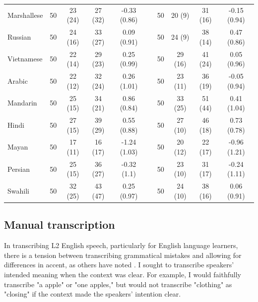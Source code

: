 \documentclass [PhD] {uclathes}
\begin{document}
\begin{table}[htbp]
\begin{tabular}{lccccccccc}
\hspace{3mm} Marshallese & 50 & 23 (24) & 27 (32) & -0.33 (0.86) & & 50 & 20 (9) & 31 (16) & -0.15 (0.94) \\
\hspace{3mm} Russian & 50 & 24 (16) & 33 (27) & 0.09 (0.91) & & 50 & 24 (9) & 38 (14) & 0.47 (0.86) \\
\hspace{3mm} Vietnamese & 50 & 22 (14) & 29 (23) & 0.25 (0.99) & & 50 & 29 (16) & 41 (24) & 0.05 (0.96) \\
\hspace{3mm} Arabic & 50 & 22 (12) & 32 (24) & 0.26 (1.01) & & 50 & 23 (11) & 36 (19) & -0.05 (0.94) \\
\hspace{3mm} Mandarin & 50 & 25 (15) & 34 (21) & 0.86 (0.84) & & 50 & 33 (25) & 51 (44) & 0.41 (1.04) \\
\hspace{3mm} Hindi & 50 & 27 (15) & 39 (29) & 0.55 (0.88) & & 50 & 27 (10) & 46 (18) & 0.73 (0.78) \\
\hspace{3mm} Mayan & 50 & 17 (11) & 16 (17) & -1.24 (1.03) & & 50 & 20 (12) & 22 (17) & -0.96 (1.21) \\
\hspace{3mm} Persian & 50 & 25 (15) & 36 (27) & -0.32 (1.1) & & 50 & 23 (10) & 31 (17) & -0.24 (1.11) \\
\hspace{3mm} Swahili & 50 & 32 (25) & 43 (47) & 0.25 (0.97) & & 50 & 24 (10) & 38 (16) & 0.06 (0.91) \\    \bottomrule
    \end{tabular}
\end{table}

\subsection{Manual transcription}

In transcribing L2 English speech, particularly for English language learners, there is a tension between transcribing grammatical mistakes and allowing for differences in accent, as others have noted \cite{yoon2019features}. I sought to transcribe speakers' intended meaning when the context was clear. For example, I would faithfully transcribe "a apple" or "one apples," but would not transcribe "clothing" as "closing" if the context made the speakers' intention clear.
\end{document}
